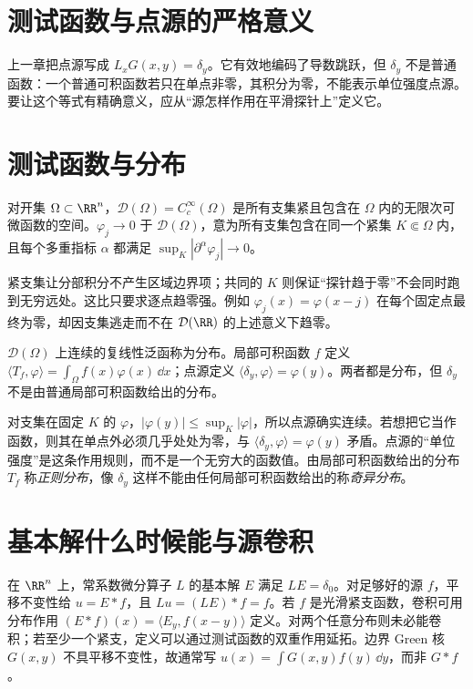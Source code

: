 \section{测试函数与点源的严格意义}
上一章把点源写成 \(L_xG(x,y)=\delta_y\)。它有效地编码了导数跳跃，但 \(\delta_y\) 不是普通函数：一个普通可积函数若只在单点非零，其积分为零，不能表示单位强度点源。要让这个等式有精确意义，应从“源怎样作用在平滑探针上”定义它。

\section{测试函数与分布}

\begin{definition}[测试函数和收敛]
对开集 \(\Omega\subset\RR^n\)，\(\mathcal D(\Omega)=C_c^\infty(\Omega)\) 是所有支集紧且包含在 \(\Omega\) 内的无限次可微函数的空间。\(\varphi_j\to0\) 于 \(\mathcal D(\Omega)\)，意为所有支集包含在同一个紧集 \(K\Subset\Omega\) 内，且每个多重指标 \(\alpha\) 都满足 \(\sup_K|\partial^\alpha\varphi_j|\to0\)。
\end{definition}

紧支集让分部积分不产生区域边界项；共同的 \(K\) 则保证“探针趋于零”不会同时跑到无穷远处。这比只要求逐点趋零强。例如 \(\varphi_j(x)=\varphi(x-j)\) 在每个固定点最终为零，却因支集逃走而不在 \(\mathcal D(\RR)\) 的上述意义下趋零。

\begin{definition}[分布]
\(\mathcal D(\Omega)\) 上连续的复线性泛函称为分布。局部可积函数 \(f\) 定义 \(\langle T_f,\varphi\rangle=\int_\Omega f(x)\varphi(x)\,\dd x\)；点源定义 \(\langle\delta_y,\varphi\rangle=\varphi(y)\)。两者都是分布，但 \(\delta_y\) 不是由普通局部可积函数给出的分布。
\end{definition}

对支集在固定 \(K\) 的 \(\varphi\)，\(|\varphi(y)|\le\sup_K|\varphi|\)，所以点源确实连续。若想把它当作函数，则其在单点外必须几乎处处为零，与 \(\langle\delta_y,\varphi\rangle=\varphi(y)\) 矛盾。点源的“单位强度”是这条作用规则，而不是一个无穷大的函数值。由局部可积函数给出的分布 \(T_f\) 称\emph{正则分布}，像 \(\delta_y\) 这样不能由任何局部可积函数给出的称\emph{奇异分布}。

\section{基本解什么时候能与源卷积}

在 \(\RR^n\) 上，常系数微分算子 \(L\) 的基本解 \(E\) 满足 \(LE=\delta_0\)。对足够好的源 \(f\)，平移不变性给 \(u=E*f\)，且 \(Lu=(LE)*f=f\)。若 \(f\) 是光滑紧支函数，卷积可用分布作用 \((E*f)(x)=\langle E_y,f(x-y)\rangle\) 定义。对两个任意分布则未必能卷积；若至少一个紧支，定义可以通过测试函数的双重作用延拓。边界 Green 核 \(G(x,y)\) 不具平移不变性，故通常写 \(u(x)=\int G(x,y)f(y)\,\dd y\)，而非 \(G*f\)。

